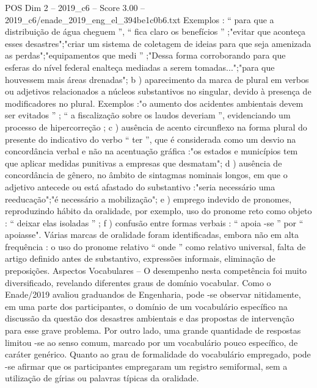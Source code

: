 \begin{textsample}{POS Dim 2 – 2019\_c6 – Score 3.00 – 2019\_c6/enade\_2019\_eng\_el\_394be1c0b6.txt}
Exemplos : “ para que a distribuição de água cheguem ”, “ fica claro os benefícios ” ;"evitar que aconteça esses desastres";"criar um sistema de coletagem de ideias para que seja amenizada as perdas";"equipamentos que medi ” ;"Dessa forma corroborando para que esferas do nível federal enalteça mediadas a serem tomadas...";"para que houvessem mais áreas drenadas"; b ) aparecimento da marca de plural em verbos ou adjetivos relacionados a núcleos substantivos no singular, devido à presença de modificadores no plural.
Exemplos :"o aumento dos acidentes ambientais devem ser evitados ” ; “ a fiscalização sobre os laudos deveriam ”, evidenciando um processo de hipercorreção ; c ) ausência de acento circunflexo na forma plural do presente do indicativo do verbo “ ter ”, que é considerada como um desvio na concordância verbal e não na acentuação gráfica :"os estados e municípios tem que aplicar medidas punitivas a empresas que desmatam"; d ) ausência de concordância de gênero, no âmbito de sintagmas nominais longos, em que o adjetivo antecede ou está afastado do substantivo :"seria necessário uma reeducação";"é necessário a mobilização"; e ) emprego indevido de pronomes, reproduzindo hábito da oralidade, por exemplo, uso do pronome reto como objeto : “ deixar elas isoladas ” ; f ) confusão entre formas verbais : “ apoia -se ” por “ apoiasse".
Várias marcas de oralidade foram identificadas, embora não em alta frequência : o uso do pronome relativo “ onde ” como relativo universal, falta de artigo definido antes de substantivo, expressões informais, eliminação de preposições.
Aspectos Vocabulares – O desempenho nesta competência foi muito diversificado, revelando diferentes graus de domínio vocabular.
Como o Enade/2019 avaliou graduandos de Engenharia, pode -se observar nitidamente, em uma parte dos participantes, o domínio de um vocabulário específico na discussão da questão dos desastres ambientais e das propostas de intervenção para esse grave problema.
Por outro lado, uma grande quantidade de respostas limitou -se ao senso comum, marcado por um vocabulário pouco específico, de caráter genérico.
Quanto ao grau de formalidade do vocabulário empregado, pode -se afirmar que os participantes empregaram um registro semiformal, sem a utilização de gírias ou palavras típicas da oralidade.

\end{textsample}

